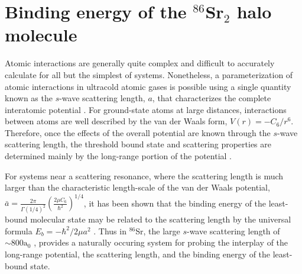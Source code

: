 \chapter{Binding energy of the $^{86}$Sr$_2$ halo molecule} \label{ch:chap5}
Atomic interactions are generally quite complex and difficult to accurately calculate for all but the simplest of systems.
Nonetheless, a parameterization of atomic interactions in ultracold atomic gases is possible using a single quantity known as the $s$-wave scattering length, $a$, that characterizes the complete interatomic potential \cite{Julienne2009a}.
For ground-state atoms at large distances, interactions between atoms are well described by the van der Waals form, $V(r)=-C_6/r^6$. 
Therefore, once the effects of the overall potential are known through the $s$-wave scattering length, the threshold bound state and scattering properties are determined mainly by the long-range portion of the potential \cite{Jones2006}.

For systems near a scattering resonance, where the scattering length is much larger than the characteristic length-scale of the van der Waals potential, $\bar{a}=\frac{2 \pi}{\Gamma(1/4)^2} \left( \frac{2 \mu C_6}{\hbar^2} \right)^{1/4}$, it has been shown that the binding energy of the least-bound molecular state may be related to the scattering length by the universal formula $E_b=-\hbar^2/2 \mu a^2$ \cite{fks96,gao04,Julienne2006}.
Thus in $^{86}$Sr, the large $s$-wave scattering length of $\sim\!800\text{a}_0$ \cite{Stein2010}, provides a naturally occuring system for probing the interplay of the long-range potential, the scattering length, and the binding energy of the least-bound state.

%
%
%


